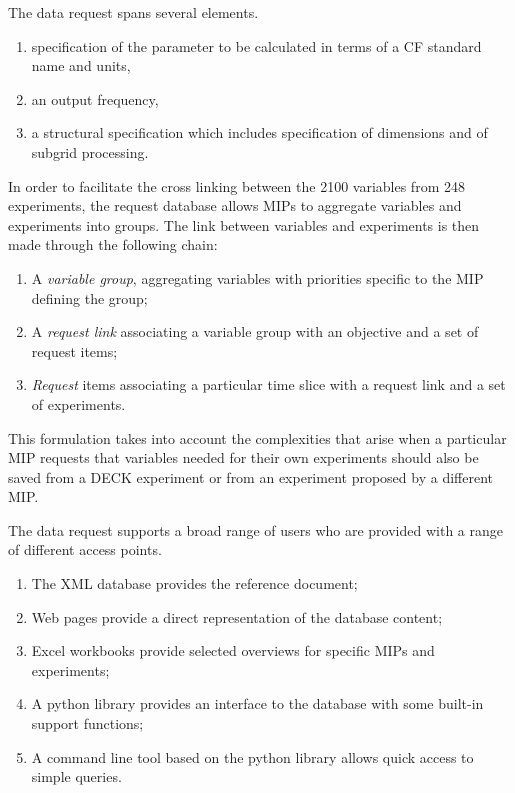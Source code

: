 \documentclass[gmd,manuscript]{copernicus}
\begin{document}
The data request spans several elements.

\begin{enumerate}
\item specification of the parameter to be calculated in terms of a CF
  standard name and units,
\item an output frequency,
\item a structural specification which includes specification of
  dimensions and of subgrid processing.
\end{enumerate}

In order to facilitate the cross linking between the 2100 variables
from 248 experiments, the request database allows MIPs to aggregate
variables and experiments into groups. The link between variables and
experiments is then made through the following chain:

\begin{enumerate}
\item A \emph{variable group}, aggregating variables with priorities
  specific to the MIP defining the group;
\item A \emph{request link} associating a variable group with an
  objective and a set of request items;
\item \emph{Request} items associating a particular time slice with a
  request link and a set of experiments.
\end{enumerate}

This formulation takes into account the complexities that arise  
when a particular MIP requests that variables needed for
their own experiments should also
be saved from a DECK experiment or from  an experiment proposed 
by a different MIP.

The data request supports a broad range of users who are 
provided with a range of different access points.

\begin{enumerate}
\item The XML database provides the reference document;
\item Web pages provide a direct representation of the database
  content;
\item Excel workbooks provide selected overviews for specific MIPs and
  experiments;
\item A python library provides an interface to the database with some
  built-in support functions;
\item A command line tool based on the python library allows quick
  access to simple queries.
\end{enumerate}
\end{document}
